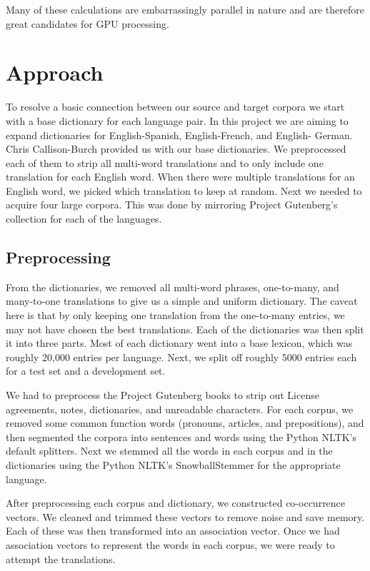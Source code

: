 \documentclass[12pt]{article}
\begin{document}
Many of these calculations are embarrassingly parallel in nature and are therefore great candidates for GPU processing.


\section{Approach}

To resolve a basic connection between our source and target corpora we start with a base dictionary for each language pair. In this project we are aiming to expand dictionaries for English-Spanish, English-French, and English-
German. Chris Callison-Burch provided us with our base dictionaries. We preprocessed each of them to strip all multi-word translations and to only include one translation for each English word. When there were multiple translations for an English word, we picked which translation to keep at random. Next we needed to acquire four large corpora. This was done by mirroring Project Gutenberg's collection for each of the languages.

\subsection{Preprocessing}

From the dictionaries, we removed all multi-word phrases, one-to-many, and many-to-one translations to give us a simple and uniform dictionary. The caveat here is that by only keeping one translation from the one-to-many entries, we may not have chosen the best translations. Each of the dictionaries was then split it into three parts. Most of each dictionary went into a base lexicon, which was roughly 20,000 entries per language. Next, we split off roughly 5000 entries each for a test set and a development set.

We had to preprocess the Project Gutenberg books to strip out License agreements, notes, dictionaries, and unreadable characters. For each corpus, we removed some common function words (pronouns, articles, and prepositions), and then segmented the corpora into sentences and words using the Python NLTK's default splitters. Next we stemmed all the words in each corpus and in the dictionaries using the Python NLTK's SnowballStemmer for the appropriate language.

After preprocessing each corpus and dictionary, we constructed co-occurrence vectors. We cleaned and trimmed these vectors to remove noise and save memory. Each of these was then transformed into an association vector. Once we had association vectors to represent the words in each corpus, we were ready to attempt the translations.
\end{document}
